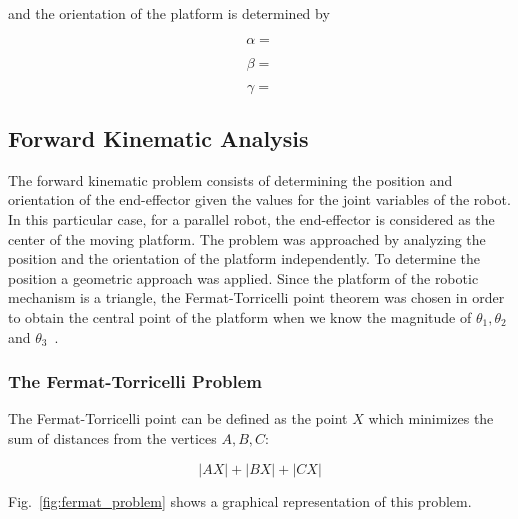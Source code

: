 \documentclass[titlepage, letterpaper, fleqn]{article}
\begin{document}
and the orientation of the platform is determined by

\begin{equation}
    \label{eq:alpha}
    \alpha = 
\end{equation}

\begin{equation}
    \label{eq:beta}
    \beta = 
\end{equation}

\begin{equation}
    \label{eq:gamma}
    \gamma =
\end{equation}

\subsection{Forward Kinematic Analysis}
\label{sub:fwd}

The forward kinematic problem consists of determining the position and orientation of the end-effector given the values for the joint variables of the robot.
In this particular case, for a parallel robot, the end-effector is considered as the center of the moving platform.
The problem was approached by analyzing the position and the orientation of the platform independently.
To determine the position a geometric approach was applied.
Since the platform of the robotic mechanism is a triangle, the Fermat-Torricelli point theorem was chosen in order to obtain the central point of the platform when we know the magnitude of $\theta_1, \theta_2$ and $\theta_3$~\cite{WeissteinFermat}.

\subsubsection{The Fermat-Torricelli Problem} %
\label{ssub:fermat_torricelli_theorem}

The Fermat-Torricelli point can be defined as the point $X$ which minimizes the sum of distances from the vertices $A, B, C$:

$$|AX| + |BX| + |CX|$$

Fig.~\ref{fig:fermat_problem} shows a graphical representation of this problem.
\end{document}
